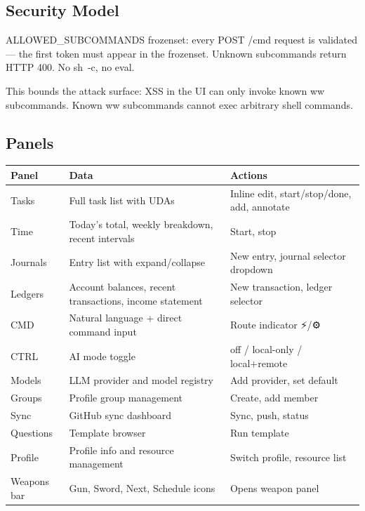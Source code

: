 \documentclass[11pt, a4paper, DIV=14]{scrartcl}
\renewcommand{\texttt}[1]{{\ttfamily\fontsize{8.5}{10.5}\selectfont\color{BabbNavy}#1}}
\begin{document}
\subsection{Security Model}\label{security-model}

\texttt{ALLOWED\_SUBCOMMANDS} frozenset: every POST /cmd request is
validated --- the first token must appear in the frozenset. Unknown
subcommands return HTTP 400. No \texttt{sh\ -c}, no eval.

This bounds the attack surface: XSS in the UI can only invoke known ww
subcommands. Known ww subcommands cannot exec arbitrary shell commands.

\subsection{Panels}\label{panels}

{\def\LTcaptype{none} %
\begin{longtable}[]{@{}
  >{\raggedright\arraybackslash}p{}
  >{\raggedright\arraybackslash}p{}
  >{\raggedright\arraybackslash}p{}@{}}
\toprule\noalign{}
\begin{minipage}[b]{\linewidth}\raggedright
Panel
\end{minipage} & \begin{minipage}[b]{\linewidth}\raggedright
Data
\end{minipage} & \begin{minipage}[b]{\linewidth}\raggedright
Actions
\end{minipage} \\
\midrule\noalign{}
\endhead
\bottomrule\noalign{}
\endlastfoot
Tasks & Full task list with UDAs & Inline edit, start/stop/done, add,
annotate \\
Time & Today's total, weekly breakdown, recent intervals & Start,
stop \\
Journals & Entry list with expand/collapse & New entry, journal selector
dropdown \\
Ledgers & Account balances, recent transactions, income statement & New
transaction, ledger selector \\
CMD & Natural language + direct command input & Route indicator ⚡/⚙ \\
CTRL & AI mode toggle & off / local-only / local+remote \\
Models & LLM provider and model registry & Add provider, set default \\
Groups & Profile group management & Create, add member \\
Sync & GitHub sync dashboard & Sync, push, status \\
Questions & Template browser & Run template \\
Profile & Profile info and resource management & Switch profile,
resource list \\
Weapons bar & Gun, Sword, Next, Schedule icons & Opens weapon panel \\
\end{longtable}
}
\end{document}
